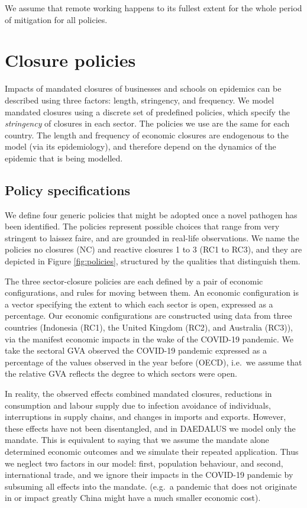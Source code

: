 \documentclass[
]{article}
\begin{document}
We assume that remote working happens to its fullest extent for the whole period of mitigation for all policies.

\section{Closure policies}\label{closure-policies}

Impacts of mandated closures of businesses and schools on epidemics can be described using three factors: length, stringency, and frequency. We model mandated closures using a discrete set of predefined policies, which specify the \emph{stringency} of closures in each sector. The policies we use are the same for each country. The length and frequency of economic closures are endogenous to the model (via its epidemiology), and therefore depend on the dynamics of the epidemic that is being modelled.

\subsection{Policy specifications}\label{policy-specifications}

We define four generic policies that might be adopted once a novel pathogen has been identified. The policies represent possible choices that range from very stringent to laissez faire, and are grounded in real-life observations. We name the policies no closures (NC) and reactive closures 1 to 3 (RC1 to RC3), and they are depicted in Figure \ref{fig:policies}, structured by the qualities that distinguish them.

The three sector-closure policies are each defined by a pair of economic configurations, and rules for moving between them. An economic configuration is a vector specifying the extent to which each sector is open, expressed as a percentage. Our economic configurations are constructed using data from three countries (Indonesia (RC1), the United Kingdom (RC2), and Australia (RC3)), via the manifest economic impacts in the wake of the COVID-19 pandemic. We take the sectoral GVA observed the COVID-19 pandemic expressed as a percentage of the values observed in the year before (OECD), i.e.~we assume that the relative GVA reflects the degree to which sectors were open.

In reality, the observed effects combined mandated closures, reductions in consumption and labour supply due to infection avoidance of individuals, interruptions in supply chains, and changes in imports and exports. However, these effects have not been disentangled, and in DAEDALUS we model only the mandate. This is equivalent to saying that we assume the mandate alone determined economic outcomes and we simulate their repeated application. Thus we neglect two factors in our model: first, population behaviour, and second, international trade, and we ignore their impacts in the COVID-19 pandemic by subsuming all effects into the mandate. (e.g.~a pandemic that does not originate in or impact greatly China might have a much smaller economic cost).
\end{document}
